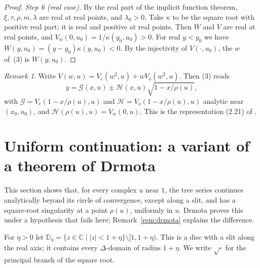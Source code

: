 \documentclass[11pt]{amsart}
\theoremstyle{definition}
\theoremstyle{remark}
\newtheorem{remark}[theorem]{Remark}
\numberwithin{equation}{section}
\newcommand{\CC}{\mathbb{C}}
\newcommand{\DD}{\mathbb{D}}
\newcommand{\abs}[1]{\lvert #1\rvert}
\begin{document}
\begin{proof}
\emph{Step 6 (real case).} By the real part of the implicit function theorem, \(\xi,\tau,\rho,m,\lambda\) are real at real points, and \(\lambda_0>0\). Take \(\kappa\) to be the square root with positive real part; it is real and positive at real points. Then \(W\) and \(V\) are real at real points, and \(V_w(0,u_0)=1/\kappa(y_0,u_0)>0\). For real \(y<y_0\) we have \(W(y,u_0)=(y-y_0)\kappa(y,u_0)<0\). By the injectivity of \(V(\cdot,u_0)\), the \(w\) of~(3) is \(W(y,u_0)\).
\end{proof}

\begin{remark}\label{rem:drmota-rep}
Write \(V(w,u)=V_e(w^2,u)+wV_o(w^2,u)\). Then (3) reads
\[
y=\mathcal{G}(x,u)\pm \mathcal{H}(x,u)\sqrt{1-x/\rho(u)},
\]
with \(\mathcal{G}=V_e(1-x/\rho(u),u)\) and \(\mathcal{H}=V_o(1-x/\rho(u),u)\) analytic near \((x_0,u_0)\), and \(\mathcal{H}(\rho(u),u)=V_w(0,u)\). This is the representation (2.21) of \cite[Thm.~2.21]{Dr}.
\end{remark}

\section{Uniform continuation: a variant of a theorem of Drmota}\label{sec:uniform}

This section shows that, for every complex \(u\) near \(1\), the tree series continues analytically beyond its circle of convergence, except along a slit, and has a square-root singularity at a point \(\rho(u)\), uniformly in \(u\). Drmota \cite[Thm.~2.21]{Dr} proves this under a hypothesis that fails here; Remark~\ref{rem:drmota} explains the difference.

For \(\eta>0\) let \(\DD_\eta=\{z\in\CC\mid\abs{z}<1+\eta\}\setminus[1,1+\eta)\). This is a disc with a slit along the real axis; it contains every \(\Delta\)-domain of radius \(1+\eta\). We write \(\sqrt{\cdot}\) for the principal branch of the square root.
\end{document}
